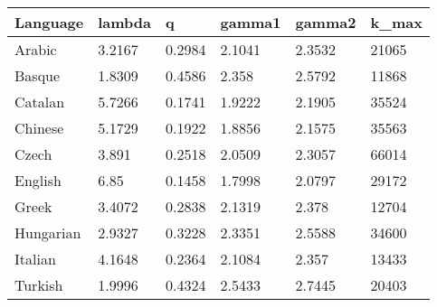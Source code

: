 \begin{table}[ht]
\centering
\begin{tabular}{llllll}
  \hline
Language & lambda & q & gamma1 & gamma2 & k\_max \\ 
  \hline
Arabic & 3.2167 & 0.2984 & 2.1041 & 2.3532 & 21065 \\ 
  Basque & 1.8309 & 0.4586 & 2.358 & 2.5792 & 11868 \\ 
  Catalan & 5.7266 & 0.1741 & 1.9222 & 2.1905 & 35524 \\ 
  Chinese & 5.1729 & 0.1922 & 1.8856 & 2.1575 & 35563 \\ 
  Czech & 3.891 & 0.2518 & 2.0509 & 2.3057 & 66014 \\ 
  English & 6.85 & 0.1458 & 1.7998 & 2.0797 & 29172 \\ 
  Greek & 3.4072 & 0.2838 & 2.1319 & 2.378 & 12704 \\ 
  Hungarian & 2.9327 & 0.3228 & 2.3351 & 2.5588 & 34600 \\ 
  Italian & 4.1648 & 0.2364 & 2.1084 & 2.357 & 13433 \\ 
  Turkish & 1.9996 & 0.4324 & 2.5433 & 2.7445 & 20403 \\ 
   \hline
\end{tabular}
\end{table}
